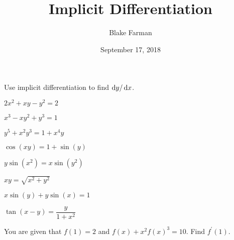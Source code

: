 \documentclass[10pt]{amsart}
\title{Implicit Differentiation}
\date{September 17, 2018}
\author{Blake Farman}
\begin{document}
\maketitle

\makenameslot

\noindent Use implicit differentiation to find \(\dif y/\dif x\).

\begin{thm}
  \(2x^2 + xy - y^2 = 2\)
\end{thm}

\vspace{2in}

\begin{thm}
  \(x^3 - xy^2 + y^3 = 1\)
\end{thm}

\newpage

\begin{thm}
  \(y^5 + x^2y^3 = 1 + x^4y\)
\end{thm}

\vspace{2in}

\begin{thm}
  \(\cos(xy) = 1 + \sin(y)\)
\end{thm}

\vspace{2in}

\begin{thm}
  \(y\sin(x^2) = x\sin(y^2)\)
\end{thm}

\vspace{2in}

\newpage

\begin{thm}
  \(xy = \sqrt{x^2 + y^2}\)
\end{thm}

\vspace{2in}

\begin{thm}
  \(x\sin(y) + y\sin(x) = 1\)
\end{thm}

\vspace{2in}

\begin{thm}
  \(\tan(x - y) = \dfrac{y}{1 + x^2}\)
\end{thm}

\vspace{2in}

\begin{thm}
  You are given that \(f(1) = 2\) and \(f(x) + x^2f(x)^3 = 10\).
  Find \(f^\prime(1)\).
\end{thm}
\end{document}
